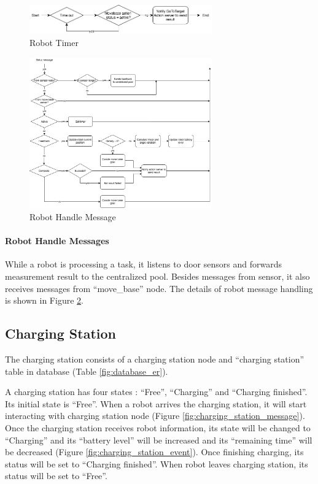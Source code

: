 \begin{figure}[htbp]
    \centering
    \includegraphics[width = 0.7\textwidth]{content/images/ch4/robot_timer.drawio.png}
    \caption{Robot Timer}
    \label{fig:robot_timer}
\end{figure}

\begin{figure}[htbp]
    \centering
    \includegraphics[width = 0.7\textwidth]{content/images/ch4/robot_message.drawio.png}
    \caption{Robot Handle Message}
    \label{fig:robot_handle_message}
\end{figure}

\paragraph{Robot Handle Messages}
While a robot is processing a task, it listens to door sensors and forwards measurement result to the centralized pool. 
Besides messages from sensor, it also receives messages from ``move\_base'' node. The details of robot message handling is shown in Figure \ref{fig:robot_handle_message}.

\subsection{Charging Station}
\label{sec:charging_station}
The charging station consists of a charging station node and ``charging station'' table in database (Table \ref{fig:database_er}). 

A charging station has four states : ``Free'', ``Charging'' and ``Charging finished''. Its initial state is ``Free''. When a robot arrives the charging station, it will start interacting with charging station node (Figure \ref{fig:charging_station_message}). 
Once the charging station receives robot information, its state will be changed to ``Charging'' and its ``battery level'' will be increased and its ``remaining time'' will be decreased (Figure \ref{fig:charging_station_event}).  
Once finishing charging, its status will be set to ``Charging finished''. When robot leaves charging station, its status will be set to ``Free''. 

